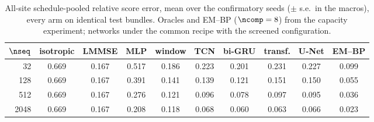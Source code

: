 \begin{table}[t]\centering\small\setlength{\tabcolsep}{4.5pt}
\caption{All-site schedule-pooled relative score error, mean over the confirmatory seeds ($\pm$ s.e.\ in the macros), every arm on identical test bundles. Oracles and EM--BP ($\ncomp=8$) from the capacity experiment; networks under the common recipe with the screened configuration.}
\label{tab:baselines}
\begin{tabular}{@{}rccccccccc@{}}
\toprule
$\nseq$ & isotropic & LMMSE & MLP & window & TCN & bi-GRU & transf. & U-Net & EM--BP \\
\midrule
32 & 0.669 & 0.167 & 0.517 & 0.186 & 0.223 & 0.201 & 0.231 & 0.227 & 0.099 \\
128 & 0.669 & 0.167 & 0.391 & 0.141 & 0.139 & 0.121 & 0.151 & 0.150 & 0.055 \\
512 & 0.669 & 0.167 & 0.276 & 0.121 & 0.096 & 0.078 & 0.097 & 0.095 & 0.036 \\
2048 & 0.669 & 0.167 & 0.208 & 0.118 & 0.068 & 0.060 & 0.063 & 0.066 & 0.023 \\
\bottomrule
\end{tabular}
\end{table}
